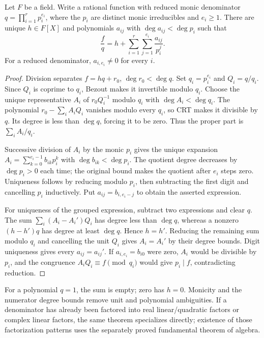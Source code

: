 \begin{theorem}\label{thm:normalized-partial-fractions}
Let $F$ be a field. Write a rational function with reduced monic
denominator $q=\prod_{i=1}^r p_i^{e_i}$, where the $p_i$ are
distinct monic irreducibles and $e_i\ge1$. There are unique
$h\in F[X]$ and polynomials $a_{ij}$ with $\deg a_{ij}<\deg p_i$
such that
\[
 \frac fq=h+\sum_{i=1}^r\sum_{j=1}^{e_i}\frac{a_{ij}}{p_i^j}.
\]
For a reduced denominator, $a_{i,e_i}\ne0$ for every $i$.
\end{theorem}
\begin{proof}
Division separates $f=hq+r_0$, $\deg r_0<\deg q$.
Set $q_i=p_i^{e_i}$ and $Q_i=q/q_i$. Since $Q_i$ is coprime
to $q_i$, Bezout makes it invertible modulo $q_i$.
Choose the unique representative $A_i$ of
$r_0Q_i^{-1}$ modulo $q_i$ with $\deg A_i<\deg q_i$.
The polynomial $r_0-\sum_i A_iQ_i$ vanishes modulo every $q_i$,
so CRT makes it divisible by $q$. Its degree is less than
$\deg q$, forcing it to be zero. Thus the proper part is
$\sum_i A_i/q_i$.

Successive division of $A_i$ by the monic $p_i$ gives the unique
expansion
$A_i=\sum_{k=0}^{e_i-1}b_{ik}p_i^k$ with $\deg b_{ik}<\deg p_i$.
The quotient degree decreases by $\deg p_i>0$ each time;
the original bound makes the quotient after $e_i$ steps zero.
Uniqueness follows by reducing modulo $p_i$, then subtracting
the first digit and cancelling $p_i$ inductively.
Put $a_{ij}=b_{i,e_i-j}$ to obtain the asserted expression.

For uniqueness of the grouped expression, subtract two expressions
and clear $q$. The sum $\sum_i(A_i-A_i')Q_i$ has degree less
than $\deg q$, whereas a nonzero $(h-h')q$ has degree at least
$\deg q$. Hence $h=h'$. Reducing the remaining sum modulo $q_i$
and cancelling the unit $Q_i$ gives $A_i=A_i'$ by their degree
bounds. Digit uniqueness gives every $a_{ij}=a_{ij}'$.
If $a_{i,e_i}=b_{i0}$ were zero, $A_i$ would be divisible by
$p_i$, and the congruence $A_iQ_i\equiv f\pmod {q_i}$
would give $p_i\mid f$, contradicting reduction.
\end{proof}
For a polynomial $q=1$, the sum is empty; zero has $h=0$.
Monicity and the numerator degree bounds remove unit and polynomial
ambiguities. If a denominator has already been factored into real
linear/quadratic factors or complex linear factors, the same theorem
specializes directly; existence of those factorization patterns uses
the separately proved fundamental theorem of algebra.

